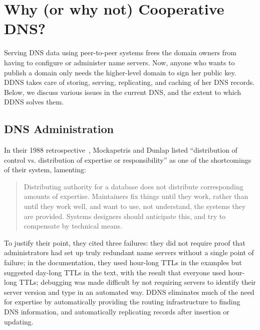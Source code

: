\section{Why (or why not) Cooperative DNS?}

Serving DNS data using peer-to-peer systems 
frees the domain owners from having to configure
or administer name servers. Now, anyone who 
wants to publish a domain only needs the higher-level
domain to sign her public key. DDNS takes care of
storing, serving, replicating, and caching of her DNS records.
Below, we discuss various issues in the current DNS, 
and the extent to which DDNS solves them.

\subsection{DNS Administration}

In their 1988 retrospective~\cite{dns}, Mockapetris and Dunlap
listed ``distribution of control vs. distribution of expertise
or responsibility'' as one of the shortcomings of their system,
lamenting:
\begin{quote}
Distributing authority for a database does not distribute
corresponding amounts of expertise.  Maintainers fix things
until they work, rather than until they work well, and want to use,
not understand, the systems they are provided.
Systems designers should anticipate this, and try to
compensate by technical means.
\end{quote}
To justify their point, they cited three failures:
they did not require proof that administrators had set up
truly redundant name servers without a single point of failure;
in the documentation, they used hour-long TTLs 
in the examples but suggested
day-long TTLs in the text, with the result that everyone used
hour-long TTLs; debugging was made difficult by not requiring
servers to identify their server version and type in an automated way.
DDNS eliminates much of the need for expertise by 
automatically providing the routing infrastructure to finding 
DNS information, and automatically replicating records 
after insertion or updating.

